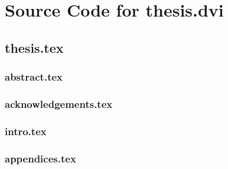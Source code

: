 \appendix

\chapter{Source Code for thesis.dvi}

\linespread{1}
\footnotesize

\section{thesis.tex}

\subsection{abstract.tex}

\subsection{acknowledgements.tex}

\subsection{intro.tex}


\subsection{appendices.tex}

